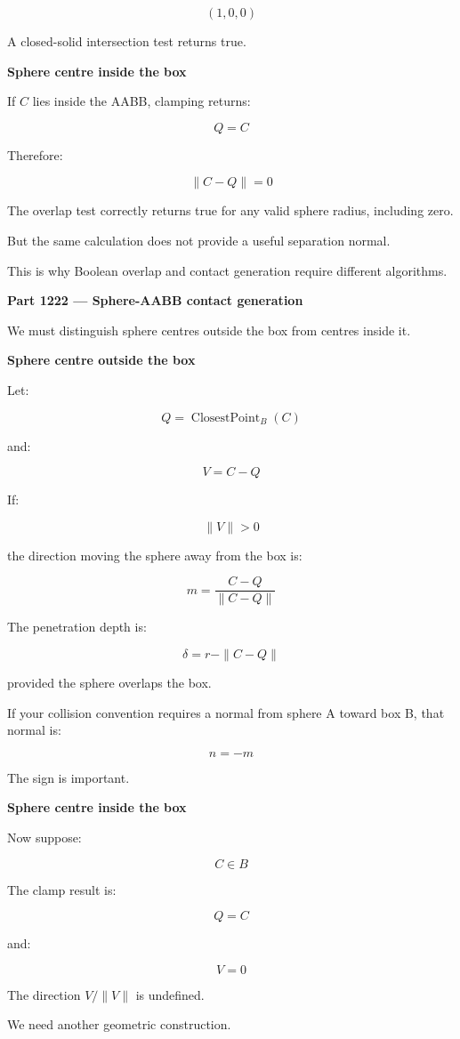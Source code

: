 \[
(1,0,0)
\]

A closed-solid intersection test returns true.

\textbf{Sphere centre inside the box}

If \(C\) lies inside the AABB, clamping returns:

\[
Q=C
\]

Therefore:

\[
\|C-Q\|=0
\]

The overlap test correctly returns true for any valid sphere radius, including zero.

But the same calculation does not provide a useful separation normal.

This is why Boolean overlap and contact generation require different algorithms.

\textbf{Part 1222 --- Sphere-AABB contact generation}

We must distinguish sphere centres outside the box from centres inside it.

\textbf{Sphere centre outside the box}

Let:

\[
Q=\operatorname{ClosestPoint}_{B}(C)
\]

and:

\[
V=C-Q
\]

If:

\[
\|V\|>0
\]

the direction moving the sphere away from the box is:

\[
\boxed{ m=\frac{C-Q}{\|C-Q\|} }
\]

The penetration depth is:

\[
\boxed{ \delta=r-\|C-Q\| }
\]

provided the sphere overlaps the box.

If your collision convention requires a normal from sphere A toward box B, that normal is:

\[
n=-m
\]

The sign is important.

\textbf{Sphere centre inside the box}

Now suppose:

\[
C\in B
\]

The clamp result is:

\[
Q=C
\]

and:

\[
V=0
\]

The direction \(V/\|V\|\) is undefined.

We need another geometric construction.

